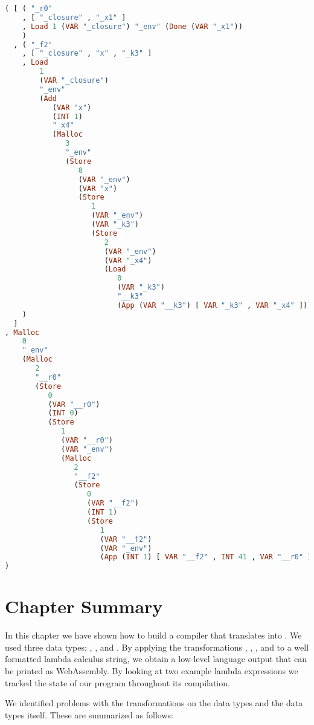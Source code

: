 {\begin{lstlisting}[language=Haskell]
( [ ( "_r0"
    , [ "_closure" , "_x1" ]
    , Load 1 (VAR "_closure") "_env" (Done (VAR "_x1"))
    )
  , ( "_f2"
    , [ "_closure" , "x" , "_k3" ]
    , Load
        1
        (VAR "_closure")
        "_env"
        (Add
           (VAR "x")
           (INT 1)
           "_x4"
           (Malloc
              3
              "_env"
              (Store
                 0
                 (VAR "_env")
                 (VAR "x")
                 (Store
                    1
                    (VAR "_env")
                    (VAR "_k3")
                    (Store
                       2
                       (VAR "_env")
                       (VAR "_x4")
                       (Load
                          0
                          (VAR "_k3")
                          "__k3"
                          (App (VAR "__k3") [ VAR "_k3" , VAR "_x4" ])))))))
    )
  ]
, Malloc
    0
    "_env"
    (Malloc
       2
       "__r0"
       (Store
          0
          (VAR "__r0")
          (INT 0)
          (Store
             1
             (VAR "__r0")
             (VAR "_env")
             (Malloc
                2
                "__f2"
                (Store
                   0
                   (VAR "__f2")
                   (INT 1)
                   (Store
                      1
                      (VAR "__f2")
                      (VAR "_env")
                      (App (INT 1) [ VAR "__f2" , INT 41 , VAR "__r0" ])))))))
)
\end{lstlisting}

\section{\label{section:summarycps}Chapter Summary}
In this chapter we have shown how to build a compiler that translates  into . We used three data types: , , and . By applying the transformations , , , and  to a well formatted lambda calculus string, we obtain a low-level language output that can be printed as WebAssembly. By looking at two example lambda expressions we tracked the state of our program throughout its compilation.

We identified problems with the transformations on the data types and the data types itself. These are summarized as follows:

}

